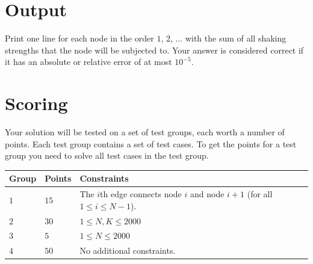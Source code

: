 \section*{Output}
Print one line for each node in the order $1$, $2$, $\dots$ with the sum of all shaking strengths that the node will be subjected to.
Your answer is considered correct if it has an absolute or relative error of at most $10^{-5}$.

\section*{Scoring}
Your solution will be tested on a set of test groups, each worth a number of points. Each test group contains
a set of test cases. To get the points for a test group you need to solve all test cases in the test group.

\noindent
\begin{tabular}{| l | l | p{12cm} |}
  \hline
  \textbf{Group} & \textbf{Points} & \textbf{Constraints} \\ \hline
  $1$    & $15$       &  The $i$th edge connects node $i$ and node $i+1$ (for all $1 \le i \le N-1$). \\ \hline 
  $2$    & $30$       &  $1 \le N,K \le 2000$ \\ \hline
  $3$    & $5$        &  $1 \le N \le 2000$ \\ \hline
  $4$    & $50$        &  No additional constraints. \\ \hline
\end{tabular}

